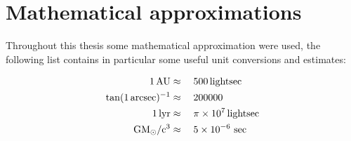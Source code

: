 \chapter{Mathematical approximations}

Throughout this thesis some mathematical approximation were used, the following
list contains in particular some useful unit conversions and estimates:

\begin{align}
    1\,\AU &\approx\quad 500\,\lightsec\eqlbl{au}\\
    \tan(1\,\arcsec)^{-1} &\approx\quad 200000\eqlbl{arcsectan}\\
    1\,\lyr &\approx\quad \pi \times 10^{7}\,\lightsec\eqlbl{lyr}\\
    \Grav\Msol/\lspeed^{3} &\approx\quad 5 \times 10^{-6}\,\sec\eqlbl{GMcinsec}
\end{align}